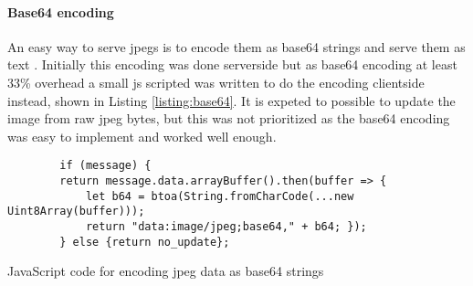 \paragraph{Base64 encoding}
An easy way to serve \glspl{jpeg} is to encode them as base64 strings and serve them as text \cite{rAnswerHowDisplay2013}.
Initially this encoding was done serverside but as base64 encoding at least 33\% overhead a small \gls{js} scripted was written to do the encoding clientside instead, shown in Listing \ref{listing:base64}.
It is expeted to possible to update the image from raw \gls{jpeg} bytes, but this was not prioritized as the base64 encoding was easy to implement and worked well enough.

\begin{listing}[H]
    \begin{verbatim}
        if (message) {
        return message.data.arrayBuffer().then(buffer => {
            let b64 = btoa(String.fromCharCode(...new Uint8Array(buffer)));
            return "data:image/jpeg;base64," + b64; });
        } else {return no_update};
    \end{verbatim}
    \caption{JavaScript code for encoding \gls{jpeg} data as base64 strings}
    \label{listing:base64}
\end{listing}






